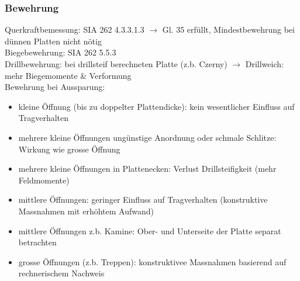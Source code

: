 %		
%		
%		
%		
%		
	\begin{minipage}{\linewidth}
		\begin{multicols}{2}
			
			

		\subsubsection{Bewehrung}
		
		Querkraftbemessung: SIA 262 4.3.3.1.3 $ \rightarrow $ Gl. 35 erfüllt, Mindestbewehrung bei dünnen Platten nicht nötig \\
		
		Biegebewehrung: SIA 262 5.5.3 \\
		
		Drillbewehrung: bei drillsteif berechneten Platte (z.b. Czerny) $ \rightarrow $ Drillweich: mehr Biegemomente \& Verformung \\
		
		Bewehrung bei Aussparung: 
			\begin{itemize}
				
				\item kleine Öffnung (bis zu doppelter Plattendicke): kein wesentlicher Einfluss auf Tragverhalten
				
				\item mehrere kleine Öffnungen ungünstige Anordnung oder schmale Schlitze: Wirkung wie grosse Öffnung
				
				\item mehrere kleine Öffnungen in Plattenecken: Verlust Drillsteifigkeit (mehr Feldmomente)
				
				\item  mittlere Öffnungen: geringer Einfluss auf Tragverhalten (konstruktive Massnahmen mit erhöhtem Aufwand)
				
				\item mittlere Öffnungen z.b. Kamine: Ober- und Unterseite der Platte separat betrachten
				
				\item grosse Öffnungen (z.b. Treppen): konstruktivee Massnahmen basierend auf rechnerischem Nachweis
				
			\end{itemize}
		
		\end{multicols}
	\end{minipage}
